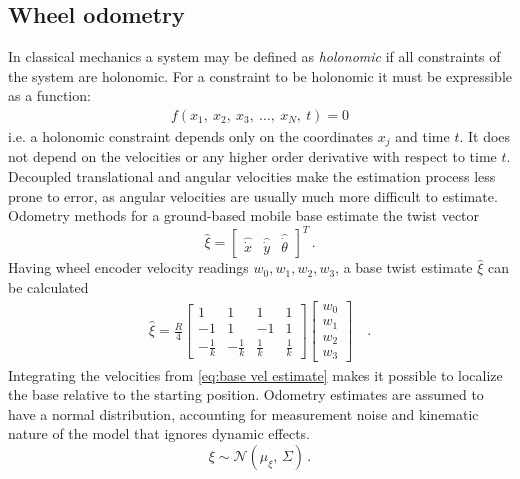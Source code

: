 \documentclass[times, utf8, diplomski, english]{fer}
\begin{document}
\subsection{Wheel odometry}
In classical mechanics a system may be defined as \textit{holonomic} if all constraints of the system are holonomic. For a constraint to be holonomic it must be expressible as a function:
\begin{align}
f(x_1,\ x_2,\ x_3,\ \ldots,\ x_N,\ t)=0
\end{align} 
i.e. a holonomic constraint depends only on the coordinates $x_j$ and time $t$. It does not depend on the velocities or any higher order derivative with respect to time $t$.
Decoupled translational and angular velocities make the estimation process less prone to error, as angular velocities are usually much more difficult to estimate.
Odometry methods for a ground-based mobile base estimate the twist vector
\begin{equation}
\hat{\xi} 
 = 
\begin{bmatrix}
\hat{\dot{x}}& \hat{\dot{y}}& \hat{\dot{\theta}}
\end{bmatrix}^T\, .
\end{equation}
Having wheel encoder velocity readings $w_0,w_1,w_2,w_3$, a base twist estimate $\hat{\xi}$ can be calculated
\begin{align}
\hat{\xi}
= 
\frac{R}{4}
\begin{bmatrix}
1 &1 &1 &1 \\
-1 &1 &-1 &1 \\
-\frac{1}{k} &-\frac{1}{k} &\frac{1}{k} &\frac{1}{k}
\end{bmatrix}
\begin{bmatrix}
w_0 \\
w_1 \\
w_2 \\ 
w_3
\end{bmatrix} \quad .
\label{eq:base vel estimate}
\end{align}
Integrating the velocities from \eqref{eq:base vel estimate} makes it possible to localize the base relative to the starting position.
Odometry estimates are assumed to have a normal distribution, accounting for measurement noise and kinematic nature of the model that ignores dynamic effects.
\begin{equation}\label{eq:wheel_sigma}
\xi \sim \mathcal{N}(\mu_\xi,\,\Sigma)\,.
\end{equation}
\end{document}
